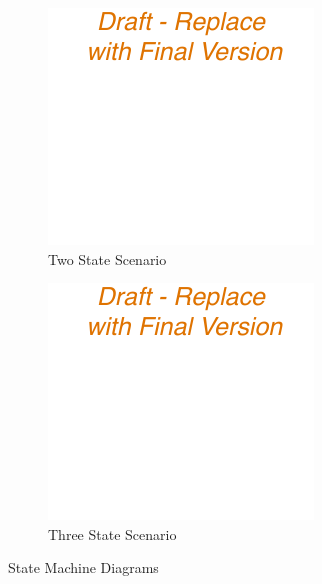 \begin{figure}
	\begin{subfigure}[b]{.5\textwidth}
	\centering
	\includegraphics{network/background/figures/two_states}
	\caption{Two State Scenario}\label{fig:network:performance_model:system_description:rrc_state_machines:two_states}
	\end{subfigure}	\begin{subfigure}[b]{.5\textwidth}
	\centering
	\includegraphics{network/background/figures/three_states}
	\caption{Three State Scenario}\label{fig:network:performance_model:system_description:rrc_state_machines:three_states}
	\end{subfigure}
	\caption{ State Machine Diagrams}\label{fig:network:performance_model:system_description:rrc_state_machines}
\end{figure}

